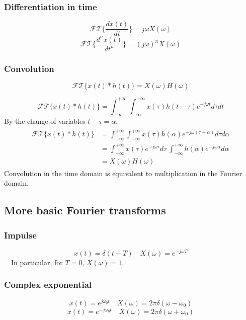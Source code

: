 \subsubsection{Differentiation in time}
\[ 
\mathcal{FT} \bigg\{ \frac{dx(t)}{dt} \bigg\} = j\omega X(\omega) 
\]
\[ 
\mathcal{FT} \bigg\{ \frac{d^{n}x(t)}{dt^{n}} \bigg\} = (j\omega)^{n} X(\omega) 
\]

\subsubsection{Convolution}
\[ 
\mathcal{FT}\{ x(t)*h(t) \} = X(\omega)H(\omega) 
\]

\begin{dv}{}
    \[ 
    \mathcal{FT}\{ x(t)*h(t)\} = \int_{-\infty}^{+\infty}\int_{-\infty}^{+\infty} x(\tau)h(t-\tau)e^{-j\omega t}d\tau dt 
    \]
    By the change of variables $t-\tau = \alpha$,
    \begin{align*} 
    \begin{split}
        \mathcal{FT}\{ x(t)*h(t)\} &= \int_{-\infty}^{+\infty}\int_{-\infty}^{+\infty} x(\tau)h(\alpha)e^{-j\omega (\tau+\alpha)}d\tau d\alpha \\
        &=\int_{-\infty}^{+\infty}x(\tau)e^{-j\omega \tau}d\tau \ \int_{-\infty}^{+\infty}h(\alpha)e^{-j\omega \alpha}d\alpha\\
        &= X(\omega)H(\omega)
     \end{split} 
     \end{align*}
     Convolution in the time domain is equivalent to multiplication in the Fourier domain.
\end{dv}

\subsection{More basic Fourier transforms}

\subsubsection{Impulse}
\[ x(t)=\delta(t-T) \quad X(\omega)=e^{-j\omega T} \]
\ \ In particular, for $T=0$, $X(\omega)=1$.

\subsubsection{Complex exponential}
\[ x(t)=e^{j\omega_{0}t} \quad X(\omega)=2\pi \delta(\omega-\omega_{0}) \]
\[ x(t)=e^{-j\omega_{0}t} \quad X(\omega)=2\pi \delta(\omega+\omega_{0}) \]

